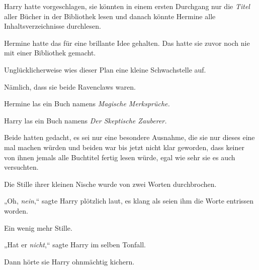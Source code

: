 Harry hatte vorgeschlagen, sie könnten in einem ersten Durchgang nur die \emph{Titel} aller Bücher in der Bibliothek lesen und danach könnte Hermine alle Inhaltsverzeichnisse durchlesen.

Hermine hatte das für eine brillante Idee gehalten. Das hatte sie zuvor noch nie mit einer Bibliothek gemacht.

Unglücklicherweise wies dieser Plan eine kleine Schwachstelle auf.

Nämlich, dass sie beide Ravenclaws waren.

Hermine las ein Buch namens \emph{Magische Merksprüche.}

Harry las ein Buch namens \emph{Der Skeptische Zauberer.}

Beide hatten gedacht, es sei nur eine besondere Ausnahme, die sie nur dieses eine mal machen würden und beiden war bis jetzt nicht klar geworden, dass keiner von ihnen jemals alle Buchtitel fertig lesen würde, egal wie sehr sie es auch versuchten.

Die Stille ihrer kleinen Nische wurde von zwei Worten durchbrochen.

„Oh, \emph{nein},“ sagte Harry plötzlich laut, es klang als seien ihm die Worte entrissen worden.

Ein wenig mehr Stille.

„Hat er \emph{nicht},“ sagte Harry im selben Tonfall.

Dann hörte sie Harry ohnmächtig kichern.

